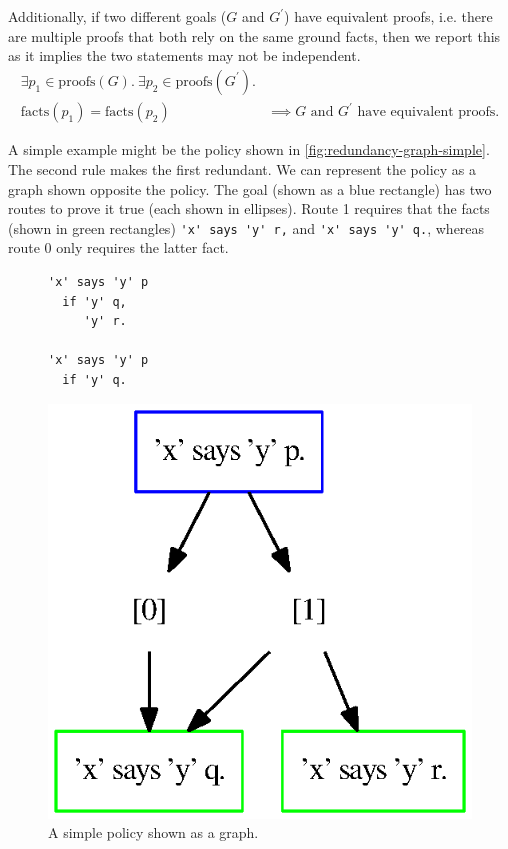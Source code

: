 \documentclass[thesis.tex]{subfiles}
\begin{document}
Additionally, if two different goals ($G$ and $G^\prime$) have
equivalent proofs, i.e. there are multiple proofs that both rely on the same ground facts, then we report this as it implies the two
statements may not be independent.
\begin{align*}
  \exists p_1 \in \text{proofs}(G).~\exists p_2 \in \text{proofs}(G^\prime). & \\
  \text{facts}(p_1) = \text{facts}(p_2)                                      & \implies \text{$G$ and $G^\prime$ have equivalent proofs.}
\end{align*}

A simple example might be the policy shown in \autoref{fig:redundancy-graph-simple}.
The second rule makes the first redundant.  We can represent the policy
as a graph shown opposite the policy.  The goal (shown as a blue rectangle) has two routes
to prove it true (each shown in ellipses).  Route 1 requires that the facts
(shown in green rectangles) \lstinline!'x' says 'y' r,! and
\lstinline!'x' says 'y' q.!, whereas route 0 only requires the
latter fact.

\begin{figure}
  \centering
  \begin{minipage}{0.4\linewidth}
    \begin{lstlisting}
'x' says 'y' p
  if 'y' q,
     'y' r.

'x' says 'y' p
  if 'y' q.
    \end{lstlisting}
  \end{minipage}
  \begin{minipage}{0.59\linewidth}
    \scriptsize{}\centering
    \def\svgwidth{\columnwidth}
    \includegraphics[width=0.59\linewidth]{figures/redundancy-simple.eps}
  \end{minipage}
  \caption{A simple policy shown as a graph.}
  \label{fig:redundancy-graph-simple}
\end{figure}
\end{document}
